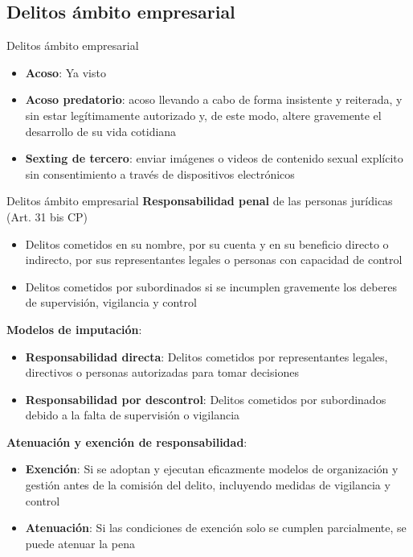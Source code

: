 \documentclass{beamer}
\begin{document}
    \subsection{Delitos ámbito empresarial}
    \begin{frame}{Delitos ámbito empresarial}
        \begin{itemize}
            \item \textbf{Acoso}: Ya visto
            \item \textbf{Acoso predatorio}: acoso llevando a cabo de forma insistente y reiterada, y sin estar legítimamente autorizado y, de este modo, altere gravemente el desarrollo de su vida cotidiana
            \item \textbf{Sexting de tercero}: enviar imágenes o videos de contenido sexual explícito sin consentimiento a través de dispositivos electrónicos
        \end{itemize}
    \end{frame}

    \begin{frame}{Delitos ámbito empresarial}
        \textbf{Responsabilidad penal} de las personas jurídicas (Art. 31 bis CP)
        \begin{itemize}
            \footnotesize
            \item Delitos cometidos en su nombre, por su cuenta y en su beneficio directo o indirecto, por sus representantes legales o personas con capacidad de control
            \item Delitos cometidos por subordinados si se incumplen gravemente los deberes de supervisión, vigilancia y control
        \end{itemize}
        \textbf{Modelos de imputación}:
        \begin{itemize}
            \footnotesize
            \item \textbf{Responsabilidad directa}: Delitos cometidos por representantes legales, directivos o personas autorizadas para tomar decisiones
            \item \textbf{Responsabilidad por descontrol}: Delitos cometidos por subordinados debido a la falta de supervisión o vigilancia
        \end{itemize}
        \textbf{Atenuación y exención de responsabilidad}:
        \begin{itemize}
            \footnotesize
            \item \textbf{Exención}: Si se adoptan y ejecutan eficazmente modelos de organización y gestión antes de la comisión del delito, incluyendo medidas de vigilancia y control
            \item \textbf{Atenuación}: Si las condiciones de exención solo se cumplen parcialmente, se puede atenuar la pena
        \end{itemize}
    \end{frame}
\end{document}
